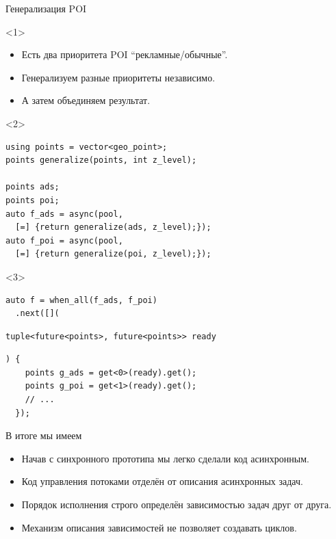 \documentclass[aspectratio=169,hyperref={unicode},17pt]{beamer}
\begin{document}
\begin{frame}[fragile,t]{Генерализация POI}
\begin{onlyenv}<1>
\begin{itemize}
 \item Есть два приоритета POI ``рекламные/обычные''.
 \item Генерализуем разные приоритеты независимо.
 \item А затем объединяем результат.
\end{itemize}
\end{onlyenv}
\begin{onlyenv}<2>
\begin{lstlisting}[style=cppcode]
using points = vector<geo_point>;
points generalize(points, int z_level);

points ads;
points poi;
auto f_ads = async(pool,
  [=] {return generalize(ads, z_level);});
auto f_poi = async(pool,
  [=] {return generalize(poi, z_level);});
\end{lstlisting}
\end{onlyenv}
\begin{onlyenv}<3>
\begin{lstlisting}[style=cppcode,aboveskip=0pt,belowskip=0pt]
auto f = when_all(f_ads, f_poi)
  .next([](
\end{lstlisting}
\begin{lstlisting}[style=cppcode,backgroundcolor=\color{gray!30},aboveskip=0pt,belowskip=0pt]
    tuple<future<points>, future<points>> ready
\end{lstlisting}
\begin{lstlisting}[style=cppcode,aboveskip=0pt,belowskip=0pt]
  ) {
    points g_ads = get<0>(ready).get();
    points g_poi = get<1>(ready).get();
    // ...
  });
\end{lstlisting}
\end{onlyenv}
\end{frame}

\begin{frame}[fragile,t]{В итоге мы имеем}
\begin{itemize}[<+->]
 \item Начав с синхронного прототипа мы легко сделали код асинхронным.
 \item Код управления потоками отделён от описания асинхронных задач.
 \item Порядок исполнения строго определён зависимостью задач друг от друга.
 \item Механизм описания зависимостей не позволяет создавать циклов.
\end{itemize}
\end{frame}
\end{document}
